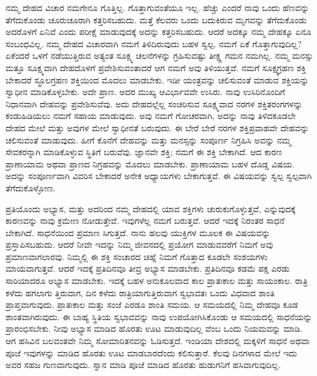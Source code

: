 ನಮ್ಮ ದೇಹದ ವಿಚಾರ ನಮಗೇನೂ ಗೊತ್ತಿಲ್ಲ. ಗೊತ್ತಾಗುವಂತೆಯೂ ಇಲ್ಲ. ಹೆಚ್ಚು ಎಂದರೆ ನಾವು ಒಂದು ಹೆಣವನ್ನು ತೆಗೆದುಕೊಂಡು ಚೂರುಚೂರಾಗಿ ಕತ್ತರಿಸಬಹುದು. ಮತ್ತೆ ಕೆಲವರು ಒಂದು ಬದುಕಿರುವ ಮೃಗವನ್ನು ತೆಗೆದುಕೊಂಡು ಅದರೊಳಗೆ ಏನಿವೆ ಎಂದು ಪರೀಕ್ಷೆ ಮಾಡುವುದಕ್ಕೆ ಅದನ್ನು ಕತ್ತರಿಸಬಹುದು. ಆದರೆ ಅದಕ್ಕೂ ನಮ್ಮ ದೇಹಕ್ಕೂ ಏನೂ ಸಂಬಂಧವಿಲ್ಲ. ನಮ್ಮ ದೇಹದ ವಿಚಾರವಾಗಿ ನಮಗೆ ತಿಳಿದಿರುವುದು ಬಹಳ ಸ್ವಲ್ಪ. ನಮಗೆ ಏಕೆ ಗೊತ್ತಾಗುವುದಿಲ್ಲ? ಏಕೆಂದರೆ ಒಳಗೆ ನಡೆಯುತ್ತಿರುವ ಅತ್ಯಂತ ಸೂಕ್ಷ್ಮ ಚಲನೆಗಳನ್ನು ಗ್ರಹಿಸುವಷ್ಟು ತೀಕ್ಷ್ಣ ಗಮನ ನಮಗಿಲ್ಲ. ನಮ್ಮ ಮನಸ್ಸು ಮತ್ತೂ ಸೂಕ್ಷ್ಮವಾಗಿ ದೇಹದೊಳಗೆ ಪ್ರವೇಶಿಸುವಂತಾದರೆ ಆಗ ನಮಗೆ ಅವು ತಿಳಿಯುತ್ತವೆ. ನಮಗೆ ಸೂಕ್ಷ್ಮಗ್ರಹಣ ಶಕ್ತಿ ಬೇಕಾದರೆ ಸ್ಥೂಲಗ್ರಹಣ ಶಕ್ತಿಯಿಂದ ಮೊದಲು ಮಾಡಬೇಕು. ಇಡೀ ಯಂತ್ರವನ್ನು ಚಲಿಸುವಂತೆ ಮಾಡುವ ಶಕ್ತಿಯನ್ನು ಸ್ವಾಧೀನ ಮಾಡಿಕೊಳ್ಳಬೇಕು. ಅದೇ ಪ್ರಾಣ. ಅದರ ಮುಖ್ಯ ಆವಿರ್ಭಾವವೇ ಉಸಿರು. ನಾವು ಉಸಿರಿನೊಂದಿಗೆ ನಿಧಾನವಾಗಿ ದೇಹವನ್ನು ಪ್ರವೇಶಿಸುವೆವು. ಅದು ದೇಹದಲ್ಲೆಲ್ಲ ಸಂಚರಿಸುವ ಸೂಕ್ಷ್ಮವಾದ ನರಗಳ ಶಕ್ತಿತರಂಗಗಳನ್ನು ಕಂಡುಹಿಡಿಯಲು ನಮಗೆ ಸಹಾಯ ಮಾಡುವುದು. ಅವು ನಮಗೆ ಗೋಚರವಾಗಿ, ಅದನ್ನು ನಾವು ತಿಳಿದಕೂಡಲೇ ದೇಹದ ಮೇಲೆ ಮತ್ತು ಅವುಗಳ ಮೇಲೆ ಸ್ವಾಧೀನತೆ ಬರುವುದು. ಈ ಬೇರೆ ಬೇರೆ ನರಗಳ ಶಕ್ತಿಪ್ರವಾಹವೇ ದೇಹವನ್ನು ಚಲಿಸುವಂತೆ ಮಾಡುವುದು. ಹೀಗೆ ಕೊನೆಗೆ ದೇಹವನ್ನು ಮತ್ತು ಮನಸ್ಸನ್ನು ಸಂಪೂರ್ಣ ನಿಗ್ರಹಿಸಿ ಅವನ್ನು ನಮ್ಮ ಸೇವಕರನ್ನಾಗಿ ಮಾಡಿಕೊಳ್ಳುವ ಸ್ಥಿತಿಗೆ ಬರುವೆವು. ಜ್ಞಾನವೇ ಶಕ್ತಿ; ನಮಗೆ ಈ ಶಕ್ತಿ ಬೇಕಾಗಿದೆ. ಆದ ಕಾರಣ ಪ್ರಾಣಾಯಾಮ ಅಥವಾ ಪ್ರಾಣದ ನಿಗ್ರಹವನ್ನು ಮೊದಲು ಮಾಡಬೇಕು. ಪ್ರಾಣಾಯಾಮ ಬಹಳ ದೊಡ್ಡ ವಿಷಯ. ಅದನ್ನು ಸಂಪೂರ್ಣವಾಗಿ ವಿವರಿಸ ಬೇಕಾದರೆ ಅನೇಕ ಅಧ್ಯಾಯಗಳು ಬೇಕಾಗುತ್ತವೆ. ಈ ವಿಷಯವನ್ನು ಸ್ವಲ್ಪ ಸ್ವಲ್ಪವಾಗಿ ತೆಗೆದುಕೊಳ್ಳೋಣ. 

ಪ್ರತಿಯೊಂದು ಅಭ್ಯಾಸ, ಮತ್ತು ಅದರಿಂದ ನಮ್ಮ ದೇಹದಲ್ಲಿ ಯಾವ ಶಕ್ತಿಗಳು ಚುರುಕುಗೊಳ್ಳುತ್ತವೆ, ಎನ್ನುವುದಕ್ಕೆ ಕಾರಣವನ್ನು ನಾವು ಕ್ರಮೇಣ ನೋಡುತ್ತೇವೆ. ಇವುಗಳೆಲ್ಲ ನಮಗೆ ಬರುತ್ತವೆ. ಆದರೆ ಇದಕ್ಕೆ ನಿರಂತರ ಸಾಧನೆ ಬೇಕಾಗಿದೆ. ಸಾಧನೆಯಿಂದ ಪ್ರಮಾಣ ಸಿಗುತ್ತದೆ. ನಾನು ಹಲವು ಯುಕ್ತಿಗಳ ಮೂಲಕ ಈ ವಿಷಯವನ್ನು ಪ್ರಸ್ತಾಪಿಸಬಹುದು. ಆದರೆ ನೀವೇ ಇದನ್ನು ನಿಮ್ಮ ಜೀವನದಲ್ಲಿ ಪ್ರಯೋಗ ಮಾಡುವವರೆಗೆ ನಿಮಗೆ ಅವು ಪ್ರಮಾಣವಾಗಲಾರವು. ನಿಮ್ಮಲ್ಲಿ ಈ ಶಕ್ತಿ ಸಂಚಾರದ ಚಿಹ್ನೆ ನಿಮಗೆ ಗೊತ್ತಾದ ಕೂಡಲೇ ಸಂಶಯಗಳು ಮಾಯವಾಗುತ್ತವೆ. ಆದರೆ ಇದಕ್ಕೆ ಪ್ರತಿದಿನವೂ ತೀವ್ರ ಅಭ್ಯಾಸ ಮಾಡಬೇಕು. ಪ್ರತಿದಿನವೂ ಕಡಮೆ ಪಕ್ಷ ಎರಡು ಸಾರಿಯಾದರೂ ಅಭ್ಯಾಸ ಮಾಡಬೇಕು. ಇದಕ್ಕೆ ಬಹಳ ಅನುಕೂಲವಾದ ಕಾಲ ಪ್ರಾತಃಕಾಲ ಮತ್ತು ಸಾಯಂಕಾಲ. ರಾತ್ರಿ ಕಳೆದು ಹಗಲಾಗು ತ್ತಿರುವಾಗ, ದಿನ ಕಳೆದು ರಾತ್ರಿಯಾಗುತ್ತಿರುವಾಗ ಸ್ವಭಾವತಃ ಒಂದು ವಿಧವಾದ ಶಾಂತಿ ಪ್ರಾಪ್ತವಾಗುವುದು. ಪ್ರಾತಃಕಾಲ ಮತ್ತು ಸಂಜೆ ಎರಡೂ ಶಾಂತಿ ಸಮಯ. ಆ ಸಮಯದಲ್ಲಿ ನಿಮ್ಮ ದೇಹವೂ ಕೂಡ ಶಾಂತವಾಗಿರುವುದು. ಈ ಬಾಹ್ಯ ಸ್ಥಿತಿಯ ಸ್ವಭಾವವನ್ನು ನಾವು ಉಪಯೋಗಿಸಿಕೊಂಡು ಆ ಸಮಯದಲ್ಲಿ ಸಾಧನೆಯನ್ನು ಪ್ರಾರಂಭಿಸಬೇಕು. ನೀವು ಅಭ್ಯಾಸ ಮಾಡಿದ ಹೊರತು ಊಟ ಮಾಡುವುದಿಲ್ಲ ವೆಂಬ ಒಂದು ನಿಯಮವನ್ನು ಮಾಡಿ. ಆಗ ಹಸಿವಿನ ಬಲವಂತವೇ ನಿಮ್ಮ ಸೋಮಾರಿತನವನ್ನು ಓಡಿಸುತ್ತದೆ. ಇಂಡಿಯಾ ದೇಶದಲ್ಲಿ ಮಕ್ಕಳಿಗೆ ಸಾಧನೆ ಅಥವಾ ಪೂಜೆ ಇವುಗಳನ್ನು ಮಾಡಿದ ಹೊರತು ಊಟ ಮಾಡಬಾರದೆಂದು ಕಲಿಸುತ್ತಾರೆ. ಕೆಲವು ದಿನಗಳಾದ ಮೇಲೆ ಇದು ಅವರ ಸಹಜ ಗುಣವಾಗುವುದು. ಸ್ನಾನ ಮಾಡಿ ಪೂಜೆ ಮಾಡಿದ ಹೊರತು ಹುಡುಗನಿಗೆ ಹಸಿವಾಗುವುದಿಲ್ಲ. 

